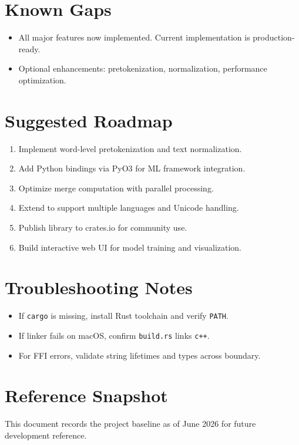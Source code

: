 \documentclass[11pt]{article}
\begin{document}
\section{Known Gaps}
\begin{itemize}[leftmargin=1.2em]
  \item All major features now implemented. Current implementation is production-ready.
  \item Optional enhancements: pretokenization, normalization, performance optimization.
\end{itemize}

\section{Suggested Roadmap}
\begin{enumerate}[leftmargin=1.5em]
  \item Implement word-level pretokenization and text normalization.
  \item Add Python bindings via PyO3 for ML framework integration.
  \item Optimize merge computation with parallel processing.
  \item Extend to support multiple languages and Unicode handling.
  \item Publish library to crates.io for community use.
  \item Build interactive web UI for model training and visualization.
\end{enumerate}

\section{Troubleshooting Notes}
\begin{itemize}[leftmargin=1.2em]
  \item If \texttt{cargo} is missing, install Rust toolchain and verify \texttt{PATH}.
  \item If linker fails on macOS, confirm \texttt{build.rs} links \texttt{c++}.
  \item For FFI errors, validate string lifetimes and types across boundary.
\end{itemize}

\section{Reference Snapshot}
This document records the project baseline as of June 2026 for future development reference.
\end{document}

